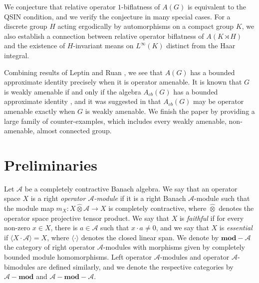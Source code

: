 \documentclass[preprint,12pt]{elsarticle}
\newcommand{\mc}[1]{\mathcal{#1}}
\newcommand{\e}[1]{\emph{#1}}
\newcommand{\la}{\langle}
\newcommand{\ra}{\rangle}
\newcommand{\Acb}{A_{cb}(G)}
\newcommand{\hten}{\widehat{\otimes}}
\begin{document}
We conjecture that relative operator $1$-biflatness of $A(G)$ is equivalent to the QSIN condition, and we verify the conjecture in many special cases. For a discrete group $H$ acting ergodically by automorphisms on a compact group $K$, we also establish a connection between relative operator biflatness of $A(K\rtimes H)$ and the existence of $H$-invariant means on $L^{\infty}(K)$ distinct from the Haar integral.

Combining results of Leptin \cite{Lep} and Ruan \cite{Ru3}, we see that $A(G)$ has a bounded approximate identity precisely when it is operator amenable. It is known that $G$ is weakly amenable if and only if the algebra $A_{cb}(G)$ has a bounded approximate identity \cite{Fo}, and it was suggested in \cite{FRS} that $A_{cb}(G)$ may be operator amenable exactly when $G$ is weakly amenable. We finish the paper by providing a large family of counter-examples, which includes every weakly amenable, non-amenable, almost connected group.


\section{Preliminaries}

Let $\mc{A}$ be a completely contractive Banach algebra. We say that an operator space $X$ is a right \e{operator $\mc{A}$-module} if it is a right Banach $\mc{A}$-module such that the module map $m_X:X\hten\mc{A}\rightarrow X$ is completely contractive, where $\hten$ denotes the operator space projective tensor product. We say that $X$ is \e{faithful} if for every non-zero $x\in X$, there is $a\in\mc{A}$ such that $x\cdot a\neq 0$, and we say that $X$ is \e{essential} if $\la X\cdot\mc{A}\ra=X$, where $\la\cdot\ra$ denotes the closed linear span. We denote by $\mathbf{mod}-\mc{A}$ the category of right operator $\mc{A}$-modules with morphisms given by completely bounded module homomorphisms. Left operator $\mc{A}$-modules and operator $\mc{A}$-bimodules are defined similarly, and we denote the respective categories by $\mc{A}-\mathbf{mod}$ and $\mc{A}-\mathbf{mod}-\mc{A}$.
\end{document}

